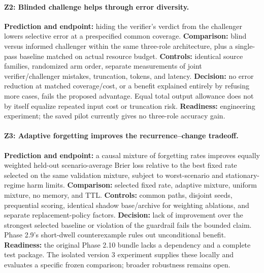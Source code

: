 \paragraph{Z2: Blinded challenge helps through error diversity.}
\textbf{Prediction and endpoint:} hiding the verifier's verdict from the challenger lowers selective error at a prespecified common coverage. \textbf{Comparison:} blind versus informed challenger within the same three-role architecture, plus a single-pass baseline matched on actual resource budget. \textbf{Controls:} identical source families, randomized arm order, separate measurements of joint verifier/challenger mistakes, truncation, tokens, and latency. \textbf{Decision:} no error reduction at matched coverage/cost, or a benefit explained entirely by refusing more cases, fails the proposed advantage. Equal total output allowance does not by itself equalize repeated input cost or truncation risk. \textbf{Readiness:} engineering experiment; the saved pilot currently gives no three-role accuracy gain.

\paragraph{Z3: Adaptive forgetting improves the recurrence--change tradeoff.}
\textbf{Prediction and endpoint:} a causal mixture of forgetting rates improves equally weighted held-out scenario-average Brier loss relative to the best fixed rate selected on the same validation mixture, subject to worst-scenario and stationary-regime harm limits. \textbf{Comparison:} selected fixed rate, adaptive mixture, uniform mixture, no memory, and TTL. \textbf{Controls:} common paths, disjoint seeds, prequential scoring, identical shadow base/archive for weighting ablations, and separate replacement-policy factors. \textbf{Decision:} lack of improvement over the strongest selected baseline or violation of the guardrail fails the bounded claim. Phase 2.9's short-dwell counterexample rules out unconditional benefit. \textbf{Readiness:} the original Phase 2.10 bundle lacks a dependency and a complete test package. The isolated version 3 experiment supplies these locally and evaluates a specific frozen comparison; broader robustness remains open.

